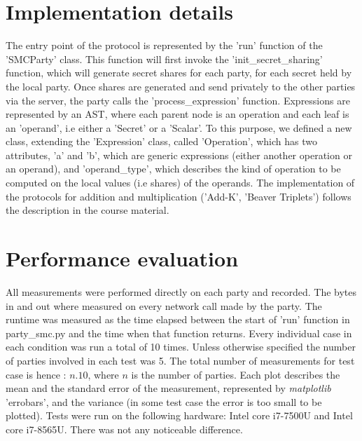 \documentclass[10pt,conference,compsocconf]{IEEEtran}
\begin{document}
\section{Implementation details}
The entry point of the protocol is represented by the 'run' function of the 'SMCParty' class. This function will first invoke the 'init\_secret\_sharing' function, which will generate secret shares for each party, for each secret held by the local party. Once shares are generated and send privately to the other parties via the server, the party calls the 'process\_expression' function. Expressions are represented by an AST, where each parent node is an operation and each leaf is an 'operand', i.e either a 'Secret' or a 'Scalar'. To this purpose, we defined a new class, extending the 'Expression' class, called 'Operation', which has two attributes, 'a' and 'b', which are generic expressions (either another operation or an operand), and 'operand\_type', which describes the kind of operation to be computed on the local values (i.e shares) of the operands. The implementation of the protocols for addition and multiplication ('Add-K', 'Beaver Triplets') follows the description in the course material.

\section{Performance evaluation}
All measurements were performed directly on each party and recorded.
The bytes in and out where measured on every
network call made by the party.
The runtime was measured as the time elapsed between the start of 'run' function in
party\_smc.py and the time when that function returns.
Every individual case in each condition was run a total of 10 times.
Unless otherwise specified the number of parties involved in each test was 5.
The total number of measurements for test case is hence : $n.10$, where $n$ is the number of parties.
Each plot describes the mean and the standard error of the measurement, represented by \textit{matplotlib} 'errobars', and the variance (in some test case the error is too small to be plotted). 
Tests were run on the following hardware: Intel core i7-7500U and Intel core i7-8565U. There was not any noticeable difference.
\end{document}
